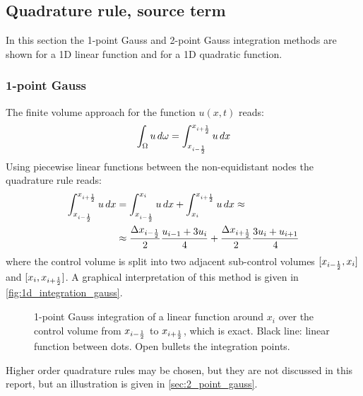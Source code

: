 \subsection{Quadrature rule, source term}\label{sec:source_quadrature_rule}
In this section the 1-point Gauss and 2-point Gauss integration methods are shown for a 1D linear function and for a 1D quadratic function.
\subsubsection{1-point Gauss}
The finite volume approach for the function $u(x,t)$ reads:
\begin{align}
    \int_\Omega u \, d\omega = \int_{x_{i-\frac{1}{2}}}^{x_{i+\frac{1}{2}}} u \, dx
\end{align}
Using piecewise linear functions between the non-equidistant nodes the quadrature rule reads:
\begin{align}
    \int_{x_{i-\frac{1}{2}}}^{x_{i+\frac{1}{2}}} u \, dx & = \int_{x_{i-\frac{1}{2}}}^{x_i} u \, dx + \int_{x_i}^{x_{i+\frac{1}{2}}} u \, dx \approx
    \\
    & \approx \frac{\Delta x_{i-\frac{1}{2}}}{2} \frac{u_{i-1} + 3 u_{i}}{4} + \frac{\Delta x_{i+\frac{1}{2}}}{2} \frac{3 u_{i} + u_{i+1}}{4} \label{eq:integral_control_volume}
\end{align}
where the control volume is split into two adjacent sub-control volumes  $[x_{i-\frac{1}{2}}, x_i]$ and $[x_i, x_{i+\frac{1}{2}}]$.
A graphical interpretation of this method is given in \autoref{fig:1d_integration_gauss}.
\begin{figure}[H]
        \begin{center}
        \end{center}
    \caption[Illustration of the 1-point Gauss integration method of a linear functions.]{1-point Gauss integration of a linear function around $x_i$ over the control volume from $x_{i-\frac{1}{2}}$ to $x_{i+\frac{1}{2}}$, which is exact.  Black line: linear function between dots. Open bullets the integration points. }\label{fig:1d_integration_gauss}
\end{figure}
Higher order quadrature rules may be chosen, but they are not discussed in this report, but an illustration is given in \autoref{sec:2_point_gauss}.
